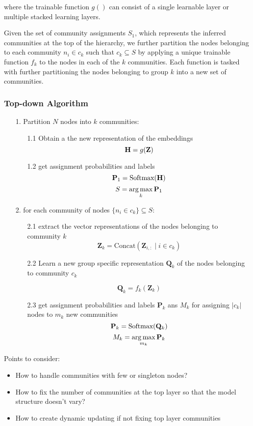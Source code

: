 \documentclass[a4paper,12pt]{article}
\DeclareMathOperator*{\argmax}{arg\,max}
\begin{document}
			where the trainable function $g()$ can consist of a single learnable layer or multiple stacked learning layers. 
			
			Given the set of community assignments $S_1$, which represents the inferred communities at the top of the hierarchy, we further partition the nodes belonging to each community $n_i \in c_k$ such that $c_k \subseteq S$ by applying a unique trainable function $f_k$ to the nodes in each of the $k$ communities. Each function is tasked with further partitioning the nodes belonging to group $k$ into a new set of communities.
			
			\subsubsection*{Top-down Algorithm}
			\begin{enumerate}
				\item[1.] Partition $N$ nodes into $k$ communities:
				\begin{enumerate}
					\item[1.1] Obtain a the new representation of the embeddings
						\[{\bf H} = g({\bf Z}) \]
					\item[1.2] get assignment probabilities and labels
						\[ \mathbf{P}_1 = \text{Softmax}({\bf H})\] 
						\[ S = \argmax_{k} {\bf P}_1\]
				\end{enumerate}
				\item[2.] for each community of nodes $\{n_i \in c_k\} \subseteq S$:
				\begin{enumerate}
					\item[2.1] extract the vector representations of the nodes belonging to community $k$ 
						\[ \mathbf{Z}_k = \text{Concat} \left( { \mathbf{Z}_{i,:} \mid i \in c_k } \right) \]
					\item[2.2] Learn a new group specific representation $\mathbf{Q}_k$ of the nodes belonging to community $c_k$
					
						\[\mathbf{Q}_k = f_k(\mathbf{Z}_k)\]
					\item[2.3] get assignment probabilities and labels $\mathbf{P}_k$ ans $M_k$ for assigning $|c_k|$ nodes to $m_k$ new communities 
						\[{\bf P}_k  = \text{Softmax}(\mathbf{Q}_k)\]
						\[ M_k = \argmax_{m_k} {\bf P}_k\] 
				\end{enumerate} 
			\end{enumerate}
			
			Points to consider:
			\begin{itemize}
				\item How to handle communities with few or singleton nodes?
				\item How to fix the number of communities at the top layer so that the model structure doesn't vary?
				\item How to create dynamic updating if not fixing top layer communities
			\end{itemize}
			
\end{document}
